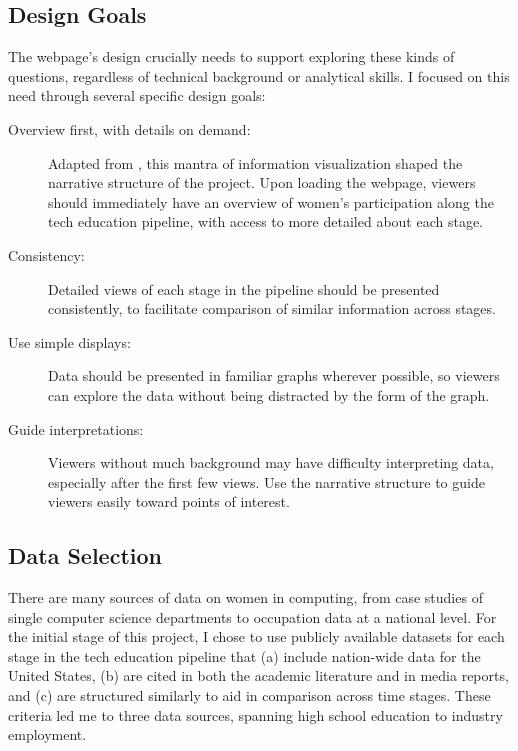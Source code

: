 \subsection{Design Goals}\label{sec:design-goals}
The webpage's design crucially needs to support exploring these kinds of questions, regardless of technical background or analytical skills. I focused on this need through several specific design goals:
\begin{description}
  \item[Overview first, with details on demand:] Adapted from \citet{Shneiderman1996Eyes}, this mantra of information visualization shaped the narrative structure of the project. Upon loading the webpage, viewers should immediately have an overview of women's participation along the tech education pipeline, with access to more detailed about each stage.
  \item[Consistency:] Detailed views of each stage in the pipeline should be presented consistently, to facilitate comparison of similar information across stages.
  \item[Use simple displays:] Data should be presented in familiar graphs wherever possible, so viewers can explore the data without being distracted by the form of the graph.
  \item[Guide interpretations:] Viewers without much background may have difficulty interpreting data, especially after the first few views. Use the narrative structure to guide viewers easily toward points of interest.
\end{description}


\subsection{Data Selection}\label{sec:design-data}
There are many sources of data on women in computing, from case studies of single computer science departments to occupation data at a national level. For the initial stage of this project, I chose to use publicly available datasets for each stage in the tech education pipeline that (a) include nation-wide data for the United States, (b) are cited in both the academic literature and in media reports, and (c) are structured similarly to aid in comparison across time stages. These criteria led me to three data sources, spanning high school education to industry employment.

